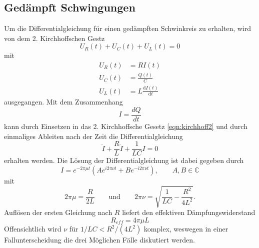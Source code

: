 \subsection{Gedämpft Schwingungen}
\label{sec:gedämpft}
Um die Differentialgleichung für einen gedämpften Schwinkreis zu erhalten, wird von dem 2. Kirchhoffschen Gestz
\begin{equation}
    U_R(t)+U_C(t)+U_L(t)=0
    \label{eqn:kirchhoff2}
\end{equation}
mit
\begin{align*}
U_R(t)&=RI(t)                           \\
U_C(t)&=\frac{Q(t)}{C}                  \\
U_L(t)&=L\frac{\text{d}I(t)}{\text{d}t}    
\end{align*}
ausgegangen. Mit dem Zusammenhang 
\begin{equation*}
    I=\frac{dQ}{dt}
\end{equation*}
kann durch Einsetzen in das 2. Kirchhoffsche Gesetz \eqref{eqn:kirchhoff2} und durch einmaliges Ableiten nach der Zeit
die Differentialgleichung
\begin{equation}
    \ddot{I}+\frac{R}{L}\dot{I}+\frac{1}{LC}I=0
    \label{eqn:DGL1}
\end{equation}
erhalten werden. Die Lösung der Differentialgleichung ist dabei gegeben durch
\begin{equation}
    I=e^{-2\pi\mu t}\left(Ae^{i2\pi\nu t}+Be^{-i2\pi\nu t}\right), \qquad A,B\in\mathbb{C}
    \label{eqn:Losung1}
\end{equation}
mit
\begin{equation*}
    2\pi \mu=\frac{R}{2L} 
    \qquad\text{und}\qquad 
    2\pi \nu=\sqrt{\frac{1}{LC}-\frac{R^2}{4L^2}} .
\end{equation*}
Auflösen der ersten Gleichung nach $R$ liefert den effektiven Dämpfungswiderstand 
\begin{equation}
    R_{eff}=4\pi\mu L 
    \label{eqn:Reff}
\end{equation}
Offensichtlich wird $\nu$ für $1/LC<R^2/(4L^2)$ komplex, weswegen in einer Fallunterscheidung die drei Möglichen Fälle 
diskutiert werden.

